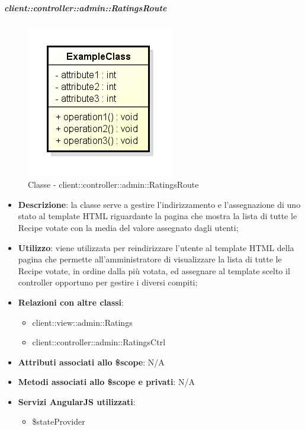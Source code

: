 		\subparagraph{client::controller::admin::RatingsRoute} %
		\label{subp:bdsm_app_client_controller_admin_ratingsroute}
			\begin{figure}[htbp]
				\centering
				\centerline{\includegraphics[scale=0.7]{./images/client/classes/example_class.png}}
				\caption{Classe - client::controller::admin::RatingsRoute}
			\end{figure}
			\begin{itemize}
				\item \textbf{Descrizione}: la classe serve a gestire l'indirizzamento e l'assegnazione di uno stato al template HTML riguardante la pagina che mostra la lista di tutte le Recipe votate con la media del valore assegnato dagli utenti;
				\item \textbf{Utilizzo}: viene utilizzata per reindirizzare l'utente al template HTML della pagina che permette all'amministratore di visualizzare la lista di tutte le Recipe votate, in ordine dalla più votata, ed assegnare al template scelto il controller opportuno per gestire i diversi compiti;
				\item \textbf{Relazioni con altre classi}:
					\begin{itemize}
						\item client::view::admin::Ratings
						\item client::controller::admin::RatingsCtrl
					\end{itemize}
				\item \textbf{Attributi associati allo \$scope}: N/A
				\item \textbf{Metodi associati allo \$scope e privati}: N/A
				\item \textbf{Servizi AngularJS utilizzati}:
					\begin{itemize}
						\item \$stateProvider
					\end{itemize}
			\end{itemize}

